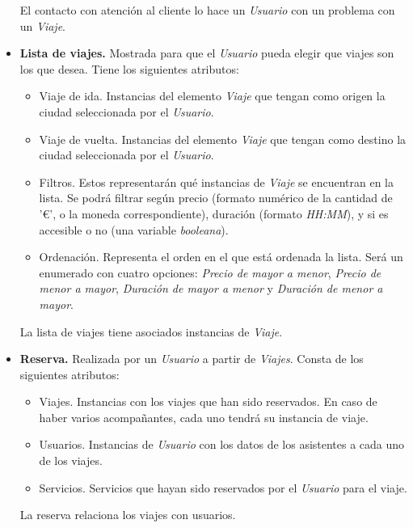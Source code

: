 \begin{itemize}
        El contacto con atención al cliente lo hace un \textit{Usuario} con un problema con un \textit{Viaje}.

    \item \textbf{Lista de viajes.} Mostrada para que el \textit{Usuario} pueda elegir que viajes son los que desea. Tiene los siguientes atributos:
        \begin{itemize}
            \item Viaje de ida. Instancias del elemento \textit{Viaje} que tengan como origen la ciudad seleccionada por el \textit{Usuario}.
            \item Viaje de vuelta. Instancias del elemento \textit{Viaje} que tengan como destino la ciudad seleccionada por el \textit{Usuario}.
            \item Filtros. Estos representarán qué instancias de \textit{Viaje} se encuentran en la lista. Se podrá filtrar según precio (formato numérico
                de la cantidad de '€', o la moneda correspondiente), duración (formato \textit{HH:MM}), y si es accesible o no (una variable \textit{booleana}).
            \item Ordenación. Representa el orden en el que está ordenada la lista. Será un enumerado con cuatro opciones: \textit{Precio de mayor a menor}, 
                \textit{Precio de menor a mayor}, \textit{Duración de mayor a menor} y \textit{Duración de menor a mayor}.
        \end{itemize}

    La lista de viajes tiene asociados instancias de \textit{Viaje}.

    \item \textbf{Reserva.} Realizada por un \textit{Usuario} a partir de \textit{Viajes}. Consta de los siguientes atributos:
        \begin{itemize}
            \item Viajes. Instancias con los viajes que han sido reservados. En caso de haber varios acompañantes, cada uno tendrá su
                instancia de viaje.
            \item Usuarios. Instancias de \textit{Usuario} con los datos de los asistentes a cada uno de los viajes.
            \item Servicios. Servicios que hayan sido reservados por el \textit{Usuario} para el viaje.
        \end{itemize}

        La reserva relaciona los viajes con usuarios.

\end{itemize}
